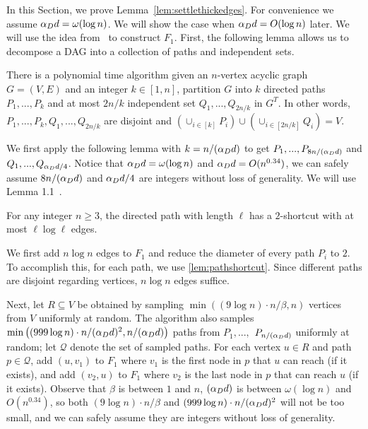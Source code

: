In this Section, we prove Lemma~\ref{lem:settlethickedges}.  For convenience we assume $\alpha_D{}d=\omega(\log n)$. We will show the case when $\alpha_D{}d=O(\log n)$ later.
We will use the idea from~\cite{KoganP22} to construct $F_1$. First, the following lemma allows us to decompose a DAG into a collection of paths and independent sets. 

\begin{lemma}
	There is a polynomial time algorithm given an $n$-vertex acyclic graph $G=(V,E)$ and an integer $k \in[1,n]$, partition $G$ into $k$ directed paths  $P_1,...,P_{k}$ and at most $2n/k$ independent set  $Q_1,...,Q_{2n/k}$ in $G^T$. In other words, $P_1,...,P_{k},Q_1,...,Q_{2n/k}$ are disjoint and $\left(\cup_{i\in[k]}P_i\right)\cup \left(\cup_{i\in[2n/k]}Q_i\right)=V$.
\end{lemma}

We first apply the following lemma with $k=n/(\alpha_D{} d)$ to get $P_1,...,P_{8n/(\alpha_D{} d)}$ and $Q_1,...,Q_{\alpha_D{} d/4}$. Notice that $\alpha_D d=\omega(\log n)$ and $\alpha_D d= O(n^{0.34})$, we can safely assume $8n/(\alpha_D{} d)$ and $\alpha_D{} d/4$ are integers without loss of generality.
We will use Lemma 1.1~\cite{Raskhodnikova10}.
\begin{lemma}\label{lem:pathshortcut}
    For any integer $n\ge 3$, the directed path with length $\ell$ has a $2$-shortcut with at most $\ell\log \ell$ edges.
\end{lemma}

We first add $n\log n$ edges to $F_1$ and reduce the diameter of every path $P_i$ to $2$. To accomplish this, for each path, we use \cref{lem:pathshortcut}. Since different paths are disjoint regarding vertices, $n\log n$ edges suffice.


Next, let $R \subseteq V$ be obtained by sampling $\min\left((9\log n)\cdot n/\beta, n\right)$ vertices from $V$ uniformly at random. The algorithm also samples $\min\left((999\log n)\cdot n/(\alpha_D{} d)^2,n/(\alpha_D{} d)\right)$ paths from $P_1,...,$ $P_{n/(\alpha_D{} d)}$ uniformly at random; let ${\mathcal Q}$ denote the set of sampled paths. For each vertex $u\in R$ and path $p\in {\mathcal Q}$, add $(u,v_1)$ to $F_1$ where $v_1$ is the first node in $p$ that $u$ can reach (if it exists), and add $(v_2,u)$ to $F_1$ where $v_2$ is the last node in $p$ that can reach $u$ (if it exists). Observe that $\beta$ is between $1$ and $n$, $(\alpha_D d)$ is between $\omega(\log n)$ and $O(n^{0.34})$, so both $(9\log n)\cdot n/\beta$ and $(999\log n)\cdot n/(\alpha_D{} d)^2$ will not be too small, and we can safely assume they are integers without loss of generality.




